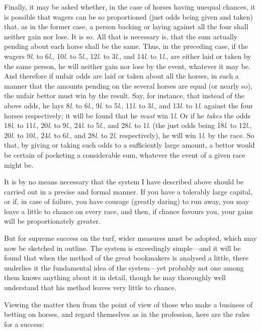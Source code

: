 \documentclass[letterpaper,12pt,oneside,openany]{memoir}
\begin{document}
Finally, it may be asked whether, in the case of
horses having unequal chances, it is possible that wagers
can be so proportioned (just odds being given and
taken) that, as in the former case, a person backing or
laying against all the four shall neither gain nor lose.
It is so. All that is necessary is, that the sum actually
pending about each horse shall be the same. Thus, in
the preceding case, if the wagers 9\textit{l}. to 6\textit{l}., 10\textit{l}. to 5\textit{l}.,
12\textit{l}. to 3\textit{l}., and 14\textit{l}. to 1\textit{l}., are either laid or taken by
the same person, he will neither gain nor lose by the
event, whatever it may be. And therefore if unfair
odds are laid or taken about all the horses, in such a
manner that the amounts pending on the several horses
are equal (or nearly so), the unfair bettor must win by
the result. Say, for instance, that instead of the above
odds, he lays 8\textit{l}. to 6\textit{l}., 9\textit{l}. to 5\textit{l}., 11\textit{l}. to 3\textit{l}., and 13\textit{l}. to
1\textit{l}. against the four horses respectively; it will be found
that he \emph{must} win 1\textit{l}. Or if he \emph{takes} the odds 18\textit{l}. to
11\textit{l}., 20\textit{l}. to 9\textit{l}., 24\textit{l}. to 5\textit{l}., and 28\textit{l}. to 1\textit{l}. (the just
odds being 18\textit{l}. to 12\textit{l}., 20\textit{l}. to 10\textit{l}., 24\textit{l}. to 6\textit{l}., and 28\textit{l}.
to 2\textit{l}. respectively), he will win 1\textit{l}. by the race. So
that, by giving or taking such odds to a sufficiently
large amount, a bettor would be certain of pocketing
a considerable sum, whatever the event of a given race
might be.

It is by no means necessary that the system I have
described above should be carried out in a precise and
formal manner. If you have a tolerably large capital,
or if, in case of failure, you have courage (greatly
daring) to run away, you may leave a little to chance
on every race, and then, if chance favours you, your
gains will be proportionately greater.

But for supreme success on the turf, wider measures
must be adopted, which may now be sketched in outline.
The system is exceedingly simple---and it will
be found that when the method of the great bookmakers
is analysed a little, there underlies it the fundamental
idea of the system---yet probably not one
among them knows anything about it in detail, though
he may thoroughly well understand that his method
leaves very little to chance.

Viewing the matter then from the point of view of
those who make a business of betting on horses, and
regard themselves as in the profession, here are the
rules for a success:
\end{document}
